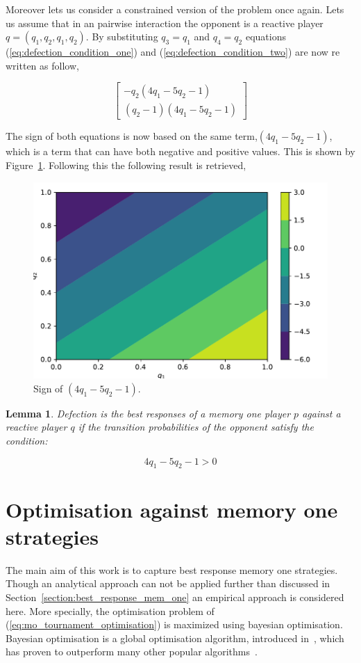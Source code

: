\documentclass[10pt]{article}
\newtheorem{lemma}[theorem]{Lemma}
\begin{document}
Moreover lets us consider a constrained version of the problem once again. Lets us
assume that in an pairwise interaction the opponent is a reactive player \(q=(q_1, q_2, q_1, q_2)\).
By substituting \(q_3=q_1\) and \(q_4=q_2\) equations (\ref{eq:defection_condition_one})
and (\ref{eq:defection_condition_two}) are now re written as follow,

\[\left[\begin{matrix}- q_{2} \left(4 q_{1} - 5 q_{2} - 1\right)\\
\left(q_{2} - 1\right) \left(4 q_{1} - 5 q_{2} - 1\right)\end{matrix}\right]\]

The sign of both equations is now based on the same term,\(\left(4 q_{1} - 5 q_{2} - 1\right)\),
which is a term that can have both negative and positive values. This is shown
by Figure~\ref{fig:sign_against_reactive}. Following this the following result is retrieved,

\begin{figure}[htbp]
    \centering
    \includegraphics[width=0.45\linewidth]{img/sign_against_reactive.pdf}
      \caption{Sign of \(\left(4 q_{1} - 5 q_{2} - 1\right)\).}
      \label{fig:sign_against_reactive}
  \end{figure}

\begin{lemma}
Defection is the best responses of a memory one player \(p\) against a reactive
player \(q\) if the transition probabilities of the opponent satisfy the
condition:

\begin{equation}
    4 q_{1} - 5 q_{2} - 1 > 0
\end{equation}
\end{lemma}

\section{Optimisation against memory one strategies}\label{section:optimisation_memone}

The main aim of this work is to capture best response memory one strategies.
Though an analytical approach can not be applied further than discussed in
Section~\ref{section:best_response_mem_one} an empirical approach is considered here.
More specially, the optimisation problem of (\ref{eq:mo_tournament_optimisation})
is maximized using bayesian optimisation. Bayesian optimisation is a
global optimisation algorithm, introduced in~\cite{Mokus1978}, which has proven to
outperform many other popular algorithms~\cite{Jones2001}.
\end{document}
